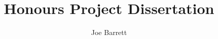\documentclass[a4paper, 12pt]{article}
\title{Honours Project Dissertation}
\author{Joe Barrett}
\begin{document}
	\begin{abstract}
		\blindtext
	\end{abstract}
	
	\blindtext
	
\end{document}
